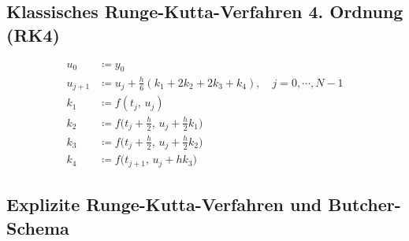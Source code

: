 \documentclass[a4paper, 11pt, accentcolor = tud3b]{tudreport}
\begin{document}
	        \subsection{Klassisches Runge-Kutta-Verfahren 4. Ordnung (RK4)}
	            \begin{align*}
	            	u_0     & \coloneqq y_0                                                                     \\
	            	u_{j+1} & \coloneqq u_j + \frac{h}{6} (k_1 + 2k_2 + 2k_3 + k_4), \quad j = 0, \cdots, N - 1 \\
	            	k_1     & \coloneqq f(t_j,\, u_j)                                                           \\
	            	k_2     & \coloneqq f\Big(t_j + \frac{h}{2},\, u_j + \frac{h}{2} k_1\Big)                   \\
	            	k_3     & \coloneqq f\Big(t_j + \frac{h}{2},\, u_j + \frac{h}{2} k_2\Big)                   \\
	            	k_4     & \coloneqq f\Big(t_{j+1},\, u_j + hk_3\Big)
	            \end{align*}
	
	        \subsection{Explizite Runge-Kutta-Verfahren und Butcher-Schema}
		        \label{sec:butcherexplicit}
	        
\end{document}
